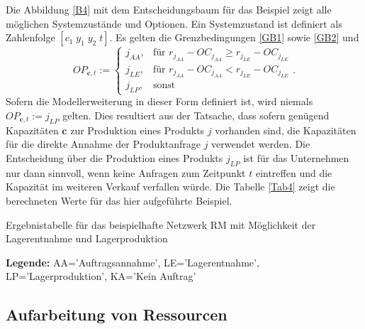 Die Abbildung \ref{B4} mit dem Entscheidungsbaum für das Beispiel zeigt alle möglichen Systemzustände und Optionen. Ein Systemzustand ist definiert als Zahlenfolge $[c_{1}\; y_{1}\; y_{2}\;t]$. Es gelten die Grenzbedingungen \eqref{GB1} sowie \eqref{GB2} und
\begin{equation}\label{GB4}
     OP_{\textbf{c}, t}:=\left\{\begin{array}{lll} j_{AA}, & \text{für } r_{j_{AA}} - OC_{j_{AA}} \ge r_{j_{LE}} - OC_{j_{LE}}\\
         j_{LE}, & \text{für } r_{j_{AA}} - OC_{j_{AA}} < r_{j_{LE}} - OC_{j_{LE}}\\
         j_{LP}, & \text{sonst}\end{array}\right. .
\end{equation}
Sofern die Modellerweiterung in dieser Form definiert ist, wird niemals $OP_{\textbf{c}, t}:=j_{LP}$ gelten. Dies resultiert aus der Tatsache, dass sofern genügend Kapazitäten $\textbf{c}$ zur Produktion eines Produkts $j$ vorhanden sind, die Kapazitäten für die direkte Annahme der Produktanfrage $j$ verwendet werden. Die Entscheidung über die Produktion eines Produkts $j_{LP}$ ist für das Unternehmen nur dann sinnvoll, wenn keine Anfragen zum Zeitpunkt $t$ eintreffen und die Kapazität im weiteren Verkauf verfallen würde. Die Tabelle \ref{Tab4} zeigt die berechneten Werte für das hier aufgeführte Beispiel.
\begin{table}
\begin{footnotesize}
    \caption{Ergebnistabelle für das beispielhafte Netzwerk RM mit Möglichkeit der Lagerentnahme und Lagerproduktion} \label{Tab4}
    \vspace*{3mm}
\begin{center}
      {\footnotesize \textbf{Legende:} AA='Auftragsannahme', LE='Lagerentnahme', LP='Lagerproduktion', KA='Kein Auftrag'} 
      \end{center}
\end{footnotesize}
\end{table}

\subsection{Aufarbeitung von Ressourcen}

